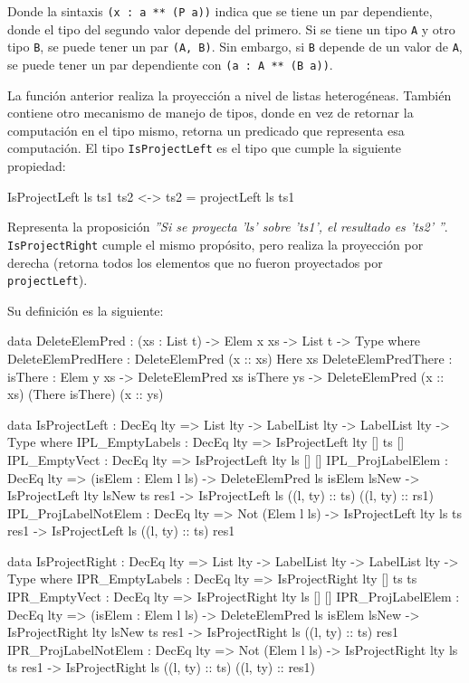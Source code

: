 Donde la sintaxis \texttt{(x : a ** (P a))} indica que se tiene un par dependiente, donde el tipo del segundo valor depende del primero. Si se tiene un tipo \texttt{A} y otro tipo \texttt{B}, se puede tener un par \texttt{(A, B)}. Sin embargo, si \texttt{B} depende de un valor de \texttt{A}, se puede tener un par dependiente con \texttt{(a : A ** (B a))}.

La función anterior realiza la proyección a nivel de listas heterogéneas. También contiene otro mecanismo de manejo de tipos, donde en vez de retornar la computación en el tipo mismo, retorna un predicado que representa esa computación. El tipo \texttt{IsProjectLeft} es el tipo que cumple la siguiente propiedad:

\begin{code}
IsProjectLeft ls ts1 ts2 <-> ts2 = projectLeft ls ts1
\end{code}

Representa la proposición \textit{''Si se proyecta 'ls' sobre 'ts1', el resultado es 'ts2' ''}. \texttt{IsProjectRight} cumple el mismo propósito, pero realiza la proyección por derecha (retorna todos los elementos que no fueron proyectados por \texttt{projectLeft}).

Su definición es la siguiente:

\begin{code}
data DeleteElemPred : (xs : List t) -> Elem x xs ->
  List t -> Type where
  DeleteElemPredHere : DeleteElemPred (x :: xs) Here xs
  DeleteElemPredThere : {isThere : Elem y xs} ->
    DeleteElemPred xs isThere ys ->
    DeleteElemPred (x :: xs) (There isThere) (x :: ys)

data IsProjectLeft : DecEq lty => List lty -> LabelList lty ->
  LabelList lty -> Type where
  IPL_EmptyLabels : DecEq lty => IsProjectLeft {lty} [] ts []
  IPL_EmptyVect : DecEq lty => IsProjectLeft {lty} ls [] []
  IPL_ProjLabelElem : DecEq lty => (isElem : Elem l ls) ->
    DeleteElemPred ls isElem lsNew ->
    IsProjectLeft {lty} lsNew ts res1 ->
    IsProjectLeft ls ((l, ty) :: ts) ((l, ty) :: rs1)
  IPL_ProjLabelNotElem : DecEq lty => Not (Elem l ls) ->
    IsProjectLeft {lty} ls ts res1 ->
    IsProjectLeft ls ((l, ty) :: ts) res1

data IsProjectRight : DecEq lty => List lty -> LabelList lty ->
  LabelList lty -> Type where
  IPR_EmptyLabels : DecEq lty => IsProjectRight {lty} [] ts ts
  IPR_EmptyVect : DecEq lty => IsProjectRight {lty} ls [] []
  IPR_ProjLabelElem : DecEq lty => (isElem : Elem l ls) ->
    DeleteElemPred ls isElem lsNew ->
    IsProjectRight {lty} lsNew ts res1 ->
    IsProjectRight ls ((l, ty) :: ts) res1
  IPR_ProjLabelNotElem : DecEq lty => Not (Elem l ls) ->
    IsProjectRight {lty} ls ts res1 ->
    IsProjectRight ls ((l, ty) :: ts) ((l, ty) :: res1)
\end{code}

